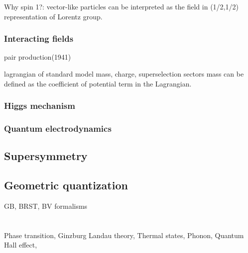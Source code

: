 \documentclass{../../large}
\begin{document}
Why spin 1?: vector-like particles can be interpreted as the field in (1/2,1/2) representation of Lorentz group.

\section{Interacting fields}
pair production(1941)

lagrangian of standard model
mass, charge, superselection sectors
mass can be defined as the coefficient of potential term in the Lagrangian.

\section{Higgs mechanism}

\section{Quantum electrodynamics}





\chapter{Supersymmetry}


\chapter{Geometric quantization}
GB, BRST, BV formalisms


\part{}

\chapter{}
Phase transition,
Ginzburg Landau theory,
Thermal states,
Phonon,
Quantum Hall effect,

\chapter{}

\chapter{}




\part{}
\end{document}
